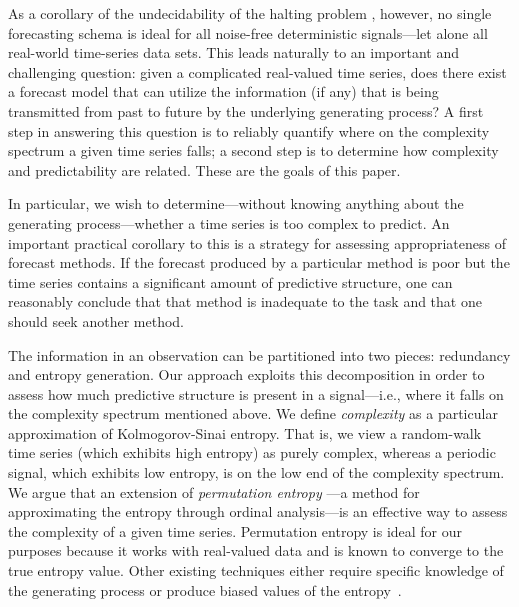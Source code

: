 As a corollary of the undecidability of the halting problem
\cite{halting-problem}, however, no single forecasting schema is ideal
for all noise-free deterministic signals\cite{weigend-book}---let
alone all real-world time-series data sets.  This leads naturally to
an important and challenging question: given a complicated real-valued
time series, does there exist a forecast model that can utilize the
information (if any) that is being transmitted from past to future by
the underlying generating process?  A first step in answering this
question is to reliably quantify where on the complexity spectrum a
given time series falls; a second step is to determine how complexity
and predictability are related.  These are the goals of this paper.

In particular, we wish to determine---without knowing anything about
the generating process---whether a time series is too complex to
predict.  An important practical corollary to this is a strategy for
assessing appropriateness of forecast methods.  If the forecast
produced by a particular method is poor but the time series contains a
significant amount of predictive structure, one can reasonably conclude that that method is inadequate
to the task and that one should seek another method.    

The information in an observation can be partitioned into two pieces:
redundancy and entropy generation\cite{crutchfield2003}.  
\label{page:redundancy}
Our approach
exploits this decomposition in order to assess how much predictive
structure is present in a signal---i.e., where it falls on the
complexity spectrum mentioned above.  We define \emph{complexity} as a
particular approximation of Kolmogorov-Sinai entropy\cite{KS-entropy}.
That is, we view a random-walk time series (which exhibits high
entropy) as purely complex, whereas a periodic signal, which exhibits
low entropy, is on the low end of the complexity spectrum.  We argue
that an extension of \emph{permutation entropy}
\cite{bandt2002per}---a method for approximating the entropy through
ordinal analysis---is an effective way to assess the complexity of a
given time series.  Permutation entropy is ideal for our purposes
because it works with real-valued data and is known to converge to the true entropy value. Other
existing techniques either require specific knowledge of the
generating process or produce biased values of the
entropy~\cite{bollt2001}.

